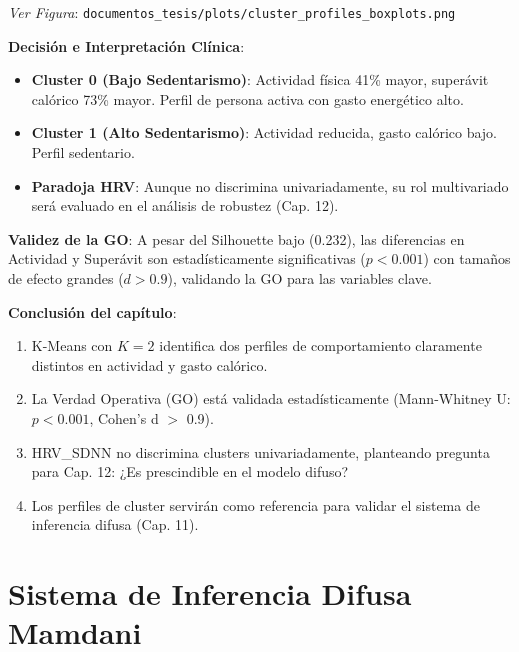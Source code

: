 \documentclass[12pt,letterpaper,twoside]{report}
\begin{document}
\textit{Ver Figura}: \texttt{documentos\_tesis/plots/cluster\_profiles\_boxplots.png}

\begin{decisionbox}
\textbf{Decisión e Interpretación Clínica}:

\begin{itemize}[noitemsep]
    \item \textbf{Cluster 0 (Bajo Sedentarismo)}: Actividad física 41\% mayor, superávit calórico 73\% mayor. Perfil de persona activa con gasto energético alto.
    \item \textbf{Cluster 1 (Alto Sedentarismo)}: Actividad reducida, gasto calórico bajo. Perfil sedentario.
    \item \textbf{Paradoja HRV}: Aunque no discrimina univariadamente, su rol multivariado será evaluado en el análisis de robustez (Cap. 12).
\end{itemize}

\textbf{Validez de la GO}: A pesar del Silhouette bajo (0.232), las diferencias en Actividad y Superávit son estadísticamente significativas ($p<0.001$) con tamaños de efecto grandes ($d>0.9$), validando la GO para las variables clave.
\end{decisionbox}

\begin{conclusionbox}
\textbf{Conclusión del capítulo}:

\begin{enumerate}[noitemsep]
    \item K-Means con $K=2$ identifica dos perfiles de comportamiento claramente distintos en actividad y gasto calórico.
    \item La Verdad Operativa (GO) está validada estadísticamente (Mann-Whitney U: $p<0.001$, Cohen's d $>$ 0.9).
    \item HRV\_SDNN no discrimina clusters univariadamente, planteando pregunta para Cap. 12: ¿Es prescindible en el modelo difuso?
    \item Los perfiles de cluster servirán como referencia para validar el sistema de inferencia difusa (Cap. 11).
\end{enumerate}
\end{conclusionbox}

\chapter{Sistema de Inferencia Difusa Mamdani}
\end{document}
